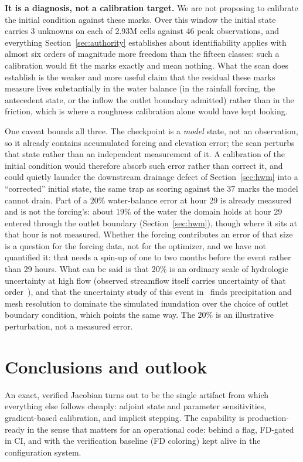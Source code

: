 \documentclass[11pt]{article}
\begin{document}
\textbf{It is a diagnosis, not a calibration target.} We are not
proposing to calibrate the initial condition against these marks.
Over this window the initial state carries $3$ unknowns on each of
2.93M cells against 46 peak observations, and everything
Section~\ref{sec:authority} establishes about identifiability applies
with almost six orders of magnitude more freedom than the fifteen
classes: such a calibration
would fit the marks exactly and mean nothing. What the scan does
establish is the weaker and more useful claim that the residual these
marks measure lives substantially in the water balance (in the
rainfall forcing, the antecedent state, or the inflow the outlet
boundary admitted) rather than in the friction, which is where a roughness calibration alone would have
kept looking.

One caveat bounds all three. The checkpoint is a \emph{model} state, not
an observation, so it already contains accumulated forcing and elevation
error; the scan perturbs that state rather than an independent
measurement of it. A calibration of the initial condition would
therefore absorb such error rather than correct it, and could quietly
launder the downstream drainage defect of Section~\ref{sec:hwm} into a
``corrected'' initial state, the same trap as scoring against the 37
marks the model cannot drain. Part of a $20\%$ water-balance error at
hour 29 is already measured and is not the forcing's: about $19\%$ of
the water the domain holds at hour 29 entered through the outlet
boundary (Section~\ref{sec:hwm}), though where it sits at that hour is
not measured. Whether the forcing contributes an error of that size is
a question for the forcing data, not for the optimizer, and we have
not quantified it: that needs a spin-up of one to two months before
the event rather than 29 hours. What can be said is that $20\%$ is an
ordinary scale of hydrologic uncertainty at high flow (observed
streamflow itself carries uncertainty of that
order~\cite{kiang2018streamflow}), and that the uncertainty study of
this event in~\cite{xu2025harvey} finds precipitation and mesh
resolution to dominate the simulated inundation over the choice of
outlet boundary condition, which points the same way. The $20\%$ is
an illustrative perturbation, not a measured error.

\section{Conclusions and outlook}

An exact, verified Jacobian turns out to be the single artifact from
which everything else follows cheaply: adjoint state and parameter
sensitivities, gradient-based calibration, and implicit stepping. The
capability is production-ready in the sense that matters for an
operational code: behind a flag, FD-gated in CI, and with the
verification baseline (FD coloring) kept alive in the configuration
system.
\end{document}
